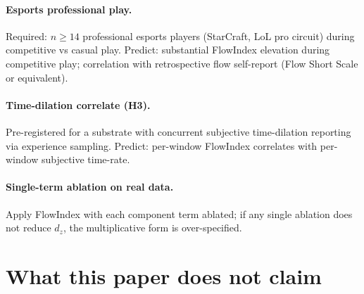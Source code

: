 \documentclass[11pt,a4paper]{article}
\begin{document}
\paragraph{Esports professional play.} Required: $n \geq 14$ professional esports players (StarCraft, LoL pro circuit) during competitive vs casual play. Predict: substantial FlowIndex elevation during competitive play; correlation with retrospective flow self-report (Flow Short Scale or equivalent).

\paragraph{Time-dilation correlate (H3).} Pre-registered for a substrate with concurrent subjective time-dilation reporting via experience sampling. Predict: per-window FlowIndex correlates with per-window subjective time-rate.

\paragraph{Single-term ablation on real data.} Apply FlowIndex with each component term ablated; if any single ablation does not reduce $d_z$, the multiplicative form is over-specified.

\section{What this paper does not claim}\label{sec:nonclaims}
\end{document}
